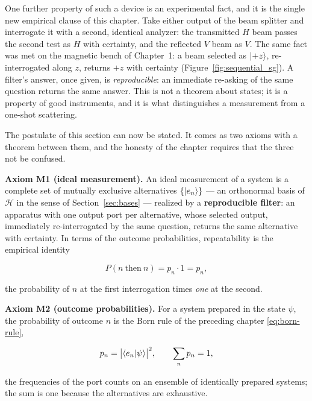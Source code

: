 One further property of such a device is an experimental fact, and it is the single new empirical clause of this chapter. Take either output of the beam splitter and interrogate it with a second, identical analyzer: the transmitted $H$ beam passes the second test as $H$ with certainty, and the reflected $V$ beam as $V$. The same fact was met on the magnetic bench of Chapter~1: a beam selected as $\ket{+z}$, re-interrogated along $z$, returns $+z$ with certainty (Figure~\ref{fig:sequential_sg}). A filter's answer, once given, is \emph{reproducible}: an immediate re-asking of the same question returns the same answer. This is not a theorem about states; it is a property of good instruments, and it is what distinguishes a measurement from a one-shot scattering.

The postulate of this section can now be stated. It comes as two axioms with a theorem between them, and the honesty of the chapter requires that the three not be confused.

\textbf{Axiom M1 (ideal measurement).} An ideal measurement of a system is a complete set of mutually exclusive alternatives $\{\ket{e_n}\}$ --- an orthonormal basis of $\mathcal{H}$ in the sense of Section~\ref{sec:bases} --- realized by a \textbf{reproducible filter}: an apparatus with one output port per alternative, whose selected output, immediately re-interrogated by the same question, returns the same alternative with certainty. In terms of the outcome probabilities, repeatability is the empirical identity
\begin{linenomath}
    \begin{equation}
        P(n\ \mathrm{then}\ n) = p_n \cdot 1 = p_n ,
        \label{eq:repeatability}
    \end{equation}
\end{linenomath}
the probability of $n$ at the first interrogation times \emph{one} at the second.

\textbf{Axiom M2 (outcome probabilities).} For a system prepared in the state $\psi$, the probability of outcome $n$ is the Born rule of the preceding chapter \eqref{eq:born-rule},
\begin{linenomath}
    \begin{equation}
        p_n = \bigl|\braket{e_n|\psi}\bigr|^2,
        \qquad
        \sum_n p_n = 1 ,
    \end{equation}
\end{linenomath}
the frequencies of the port counts on an ensemble of identically prepared systems; the sum is one because the alternatives are exhaustive.

